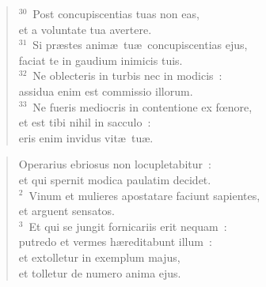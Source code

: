 \begin{flushleft}\begin{verse}${}^{30}$~Post concupiscentias tuas non eas,\\ et a voluntate tua avertere.\\
${}^{31}$~Si pr\ae stes anim\ae\ tu\ae\ concupiscentias ejus,\\ faciat te in gaudium inimicis tuis.\\
${}^{32}$~Ne oblecteris in turbis nec in modicis~:\\ assidua enim est commissio illorum.\\
${}^{33}$~Ne fueris mediocris in contentione ex fœnore,\\ et est tibi nihil in sacculo~:\\ eris enim invidus vit\ae\ tu\ae .\end{verse}\end{flushleft}


\begin{flushleft}\begin{verse}\vspace{-19pt}\hspace{6pt}Operarius ebriosus non locupletabitur~:\\\hspace{6pt} et qui spernit modica paulatim decidet.\\
${}^{2}$~Vinum et mulieres apostatare faciunt sapientes,\\ et arguent sensatos.\\
${}^{3}$~Et qui se jungit fornicariis erit nequam~:\\ putredo et vermes h\ae reditabunt illum~:\\ et extolletur in exemplum majus,\\ et tolletur de numero anima ejus.\end{verse}\end{flushleft}


